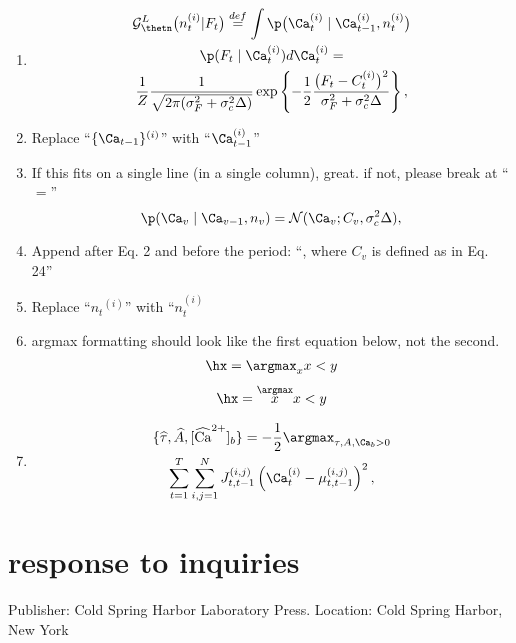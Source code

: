 \begin{enumerate}

\item 
\begin{multline*} \label{eq:q_n_lin}
\mathcal{G}_{\thetn}^L\big(n_t^{(i)} | F_t\big)  \stackrel{def}{=}
\int \p \big( \Ca_t^{(i)} \mid \Ca^{(i)}_{t-1}, n_t^{(i)} \big) \\
 \p(F_t \mid \Ca_t^{(i)}) d\Ca_t^{(i)} =   \\ 
 \frac{1}{Z} \frac{1}{\sqrt{2 \pi (\sigma_F^2 + \sigma_c^2 \Delta)}} \exp \left\{-\frac{1}{2}\frac{\big(F_t - C_t^{(i)} \big)^2}{\sigma_F^2 + \sigma_c^2 \Delta}\right\}, 
\end{multline*}
\item Replace ``$\{\Ca_{t-1}\}^{(i)}$'' with ``$\Ca_{t-1}^{(i)}$''
\item If this fits on a single line (in a single column), great.  if not, please break at ``$=$''
\begin{equation*}
\p(\Ca_v \mid \Ca_{v-1}, n_v) = \mathcal{N}(\Ca_v; C_{v}, \sigma_c^2 \Delta),
\end{equation*}
\item Append after Eq. 2 and before the period: ``, where $C_v$ is defined as in Eq. 24''
\item Replace ``${n_t}^{(i)}$'' with ``$n_t^{(i)}$
\item argmax formatting should look like the first equation below, not the second.  
\begin{align*}
\hx = \argmax_{x} x<y
\end{align*}
\begin{align*}
\hx = \overset{\argmax}{x} x<y
\end{align*}
\item 
\begin{multline*} \label{eq:c_trans}
\{\widehat{\tau}, \widehat{A}, \wCab\} = -\frac{1}{2}  \argmax_{\tau, A, \Ca_b > 0} \\
\sum_{t=1}^T \sum_{i,j=1}^N  J^{(i,j)}_{t,t-1} \left(\Ca_t^{(i)} - \mu_{t,t-1}^{(i,j)} \right)^2,
\end{multline*}
\end{enumerate}


\newpage \clearpage
\section{response to inquiries}

\ena
\item Publisher: Cold Spring Harbor Laboratory Press.  Location: Cold Spring Harbor, New York
\enb


\clearpage \newpage


%



